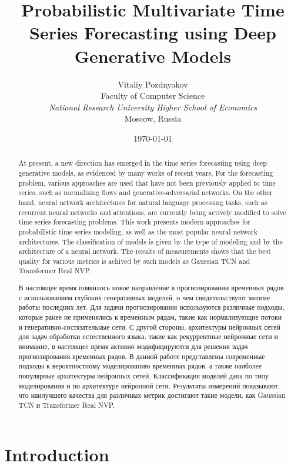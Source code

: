 \documentclass[12pt,a4paper]{article}
\title{Probabilistic Multivariate Time Series Forecasting using Deep Generative Models}
\date{\today}
\author{
    \small Vitaliy Pozdnyakov \\
    \small Faculty of Computer Science \\
    \small \textit{National Research University Higher School of Economics} \\
    \small Moscow, Russia\\
    }
\begin{document}
\begin{abstract}
At present, a new direction has emerged in the time series forecasting using deep generative models, as evidenced by many works of recent years. For the forecasting problem, various approaches are used that have not been previously applied to time series, such as normalizing flows and generative-adversarial networks. On the other hand, neural network architectures for natural language processing tasks, such as recurrent neural networks and attentions, are currently being actively modified to solve time series forecasting problems. This work presents modern approaches for probabilistic time series modeling, as well as the most popular neural network architectures. The classification of models is given by the type of modeling and by the architecture of a neural network. The results of measurements shows that the best quality for various metrics is achived by such models as Gaussian TCN and Transformer Real NVP.
\end{abstract}
\begin{abstract}
В настоящее время появилось новое направление в прогнозировании временных рядов с использованием глубоких генеративных моделей, о чем свидетельствуют многие работы последних лет. Для задачи прогнозирования используются различные подходы, которые ранее не применялись к временным рядам, такие как нормализующие потоки и генеративно-состязательные сети. С другой стороны, архитектуры нейронных сетей для задач обработки естественного языка, такие как рекуррентные нейронные сети и внимание, в настоящее время активно модифицируются для решения задач прогнозирования временных рядов. В данной работе представлены современные подходы к вероятностному моделированию временных рядов, а также наиболее популярные архитектуры нейронных сетей. Классификация моделей дана по типу моделирования и по архитектуре нейронной сети. Результаты измерений показывают, что наилучшего качества для различных метрик достигают такие модели, как Gaussian TCN и Transformer Real NVP.
\end{abstract}

\newpage

\tableofcontents

\newpage

\section{Introduction}
\end{document}
